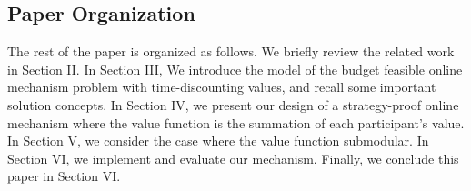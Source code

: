 \documentclass[conference,compsocconf,letterpaper,10pt]{IEEEtran}
\newcommand{\ie}{{\em i.e.}}
\begin{document}
\subsection{Paper Organization}
The rest of the paper is organized as follows. We briefly review the related work in Section II. In Section III, We introduce the model of the budget feasible online mechanism problem with time-discounting values, and recall some important solution concepts. In Section IV, we present our design of a strategy-proof online  mechanism where the value function is the summation of each participant's value. In Section V, we consider the case where the value function submodular. In Section VI, we implement and evaluate our mechanism. Finally, we conclude this paper in Section VI.
\end{document}
